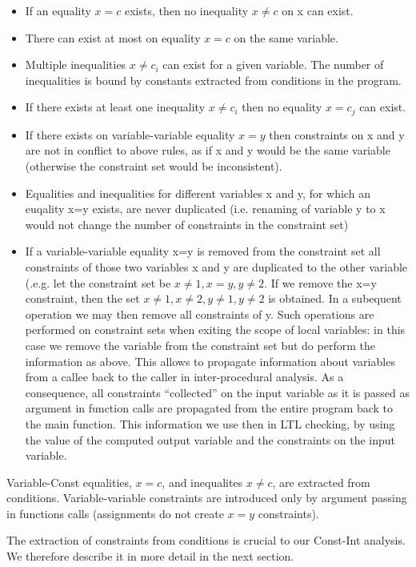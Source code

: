 \begin{itemize}
\item If an equality $x=c$ exists, then no inequality $x\neq c$ on x can exist.
\item There can exist at most on equality $x=c$ on the same variable.
\item Multiple inequalities $x \neq c_i$ can exist for a given variable. The number of inequalities is bound by constants extracted from conditions in the program.
\item If there exists at least one inequality $x\neq c_i$ then no equality $x=c_j$ can exist.
\item If there exists on variable-variable equality $x=y$ then constraints on x and y are not in conflict to above rules, as if x and y would be the same variable (otherwise the constraint set would be inconsistent).
\item Equalities and inequalities for different variables x and y, for which an euqality x=y exists, are never duplicated (i.e. renaming of variable y to x would not change the number of constraints in the constraint set)
\item If a variable-variable equality x=y is removed from the
  constraint set all constraints of those two variables x and y are
  duplicated to the other variable (.e.g. let the constraint set be
  ${x\neq 1, x=y, y\neq 2}$. If we remove the x=y constraint, then the
  set ${x\neq 1, x\neq 2, y\neq 1, y \neq 2}$ is obtained. In a
  subequent operation we may then remove all constraints of y. Such
  operations are performed on constraint sets when exiting the scope
  of local variables: in this case we remove the variable from the
  constraint set but do perform the information as above. This allows
  to propagate information about variables from a callee back to the
  caller in inter-procedural analysis. As a consequence, all
  constraints ``collected'' on the input variable as it is passed as
  argument in function calls are propagated from the entire program
  back to the main function. This information we use then in LTL
  checking, by using the value of the computed output variable and the
  constraints on the input variable.
\end{itemize}

Variable-Const equalities, $x=c$, and inequalites $x\neq c$, are
extracted from conditions. Variable-variable constraints are
introduced only by argument passing in functions calls (assignments do
not create $x=y$ constraints).

The extraction of constraints from conditions is crucial to our
Const-Int analysis. We therefore describe it in more detail in the
next section.

